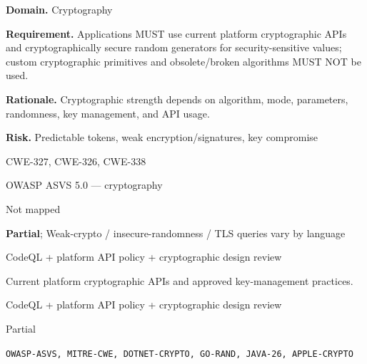 \documentclass[10pt,letterpaper]{article}
\newcommand{\prioritybadge}[2]{\tcbox[on line,boxrule=0pt,arc=1.2mm,boxsep=0.7mm,left=1mm,right=1mm,top=0.4mm,bottom=0.4mm,colback=#2!12,coltext=#2]{\scriptsize\bfseries #1}}
\begin{document}
\begin{rulebox}[title={\texttt{SCS-ALL-CRYPTO-001} \hfill \prioritybadge{Critical Control}{Critical}}]
\textbf{Domain.} Cryptography

\textbf{Requirement.} Applications MUST use current platform cryptographic APIs and cryptographically secure random generators for security-sensitive values; custom cryptographic primitives and obsolete/broken algorithms MUST NOT be used.

\textbf{Rationale.} Cryptographic strength depends on algorithm, mode, parameters, randomness, key management, and API usage.

\textbf{Risk.} Predictable tokens, weak encryption/signatures, key compromise

\begin{description}[leftmargin=2.65cm,labelwidth=2.3cm,style=nextline,itemsep=1pt,topsep=3pt]
  \item[CWE] CWE-327, CWE-326, CWE-338
  \item[OWASP] OWASP ASVS 5.0 --- cryptography
  \item[CERT] Not mapped
  \item[CodeQL] \textbf{Partial}; Weak-crypto / insecure-randomness / TLS queries vary by language
  \item[Enforcement] CodeQL + platform API policy + cryptographic design review
  \item[Prevention] Current platform cryptographic APIs and approved key-management practices.
  \item[Verification] CodeQL + platform API policy + cryptographic design review
  \item[Automation] Partial
  \item[Sources] \texttt{OWASP-ASVS, MITRE-CWE, DOTNET-CRYPTO, GO-RAND, JAVA-26, APPLE-CRYPTO}
\end{description}
\end{rulebox}
\end{document}
